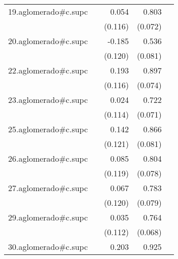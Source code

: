 {\begin{longtable}{l*{4}{D{.}{.}{-1}}}
\addlinespace
19.aglomerado#c.supc&                     &       0.054         &       0.803\sym{***}&                     \\
            &                     &     (0.116)         &     (0.072)         &                     \\
\addlinespace
20.aglomerado#c.supc&                     &      -0.185         &       0.536\sym{***}&                     \\
            &                     &     (0.120)         &     (0.081)         &                     \\
\addlinespace
22.aglomerado#c.supc&                     &       0.193         &       0.897\sym{***}&                     \\
            &                     &     (0.116)         &     (0.074)         &                     \\
\addlinespace
23.aglomerado#c.supc&                     &       0.024         &       0.722\sym{***}&                     \\
            &                     &     (0.114)         &     (0.071)         &                     \\
\addlinespace
25.aglomerado#c.supc&                     &       0.142         &       0.866\sym{***}&                     \\
            &                     &     (0.121)         &     (0.081)         &                     \\
\addlinespace
26.aglomerado#c.supc&                     &       0.085         &       0.804\sym{***}&                     \\
            &                     &     (0.119)         &     (0.078)         &                     \\
\addlinespace
27.aglomerado#c.supc&                     &       0.067         &       0.783\sym{***}&                     \\
            &                     &     (0.120)         &     (0.079)         &                     \\
\addlinespace
29.aglomerado#c.supc&                     &       0.035         &       0.764\sym{***}&                     \\
            &                     &     (0.112)         &     (0.068)         &                     \\
\addlinespace
30.aglomerado#c.supc&                     &       0.203         &       0.925\sym{***}&                     \\

\end{longtable}}
